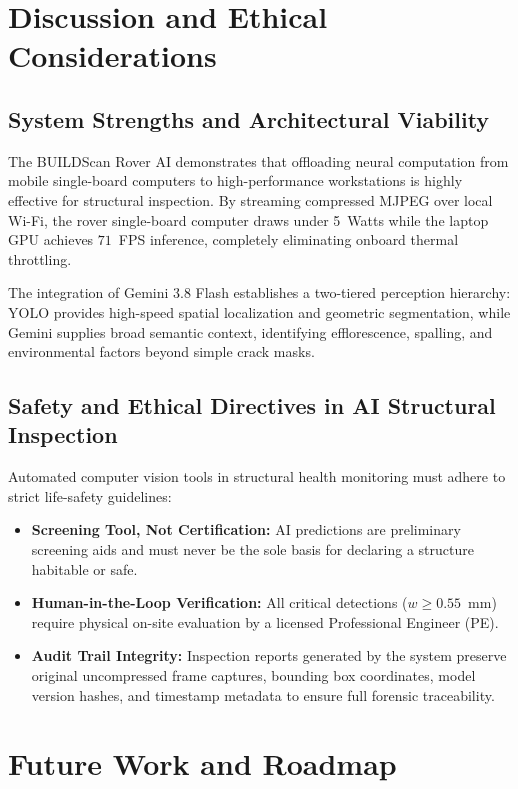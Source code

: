 \documentclass[12pt,a4paper,oneside]{report}
\begin{document}
\chapter{Discussion and Ethical Considerations}
\label{ch:discussion}
\enlargethispage{2\baselineskip}

\section{System Strengths and Architectural Viability}
The BUILDScan Rover AI demonstrates that offloading neural computation from mobile single-board computers to high-performance workstations is highly effective for structural inspection. By streaming compressed MJPEG over local Wi-Fi, the rover single-board computer draws under 5~Watts while the laptop GPU achieves $71$~FPS inference, completely eliminating onboard thermal throttling.

The integration of Gemini 3.8 Flash establishes a two-tiered perception hierarchy: YOLO provides high-speed spatial localization and geometric segmentation, while Gemini supplies broad semantic context, identifying efflorescence, spalling, and environmental factors beyond simple crack masks.

\section{Safety and Ethical Directives in AI Structural Inspection}
Automated computer vision tools in structural health monitoring must adhere to strict life-safety guidelines:
\begin{itemize}\setlength{\itemsep}{2pt}\setlength{\parsep}{0pt}
  \item \textbf{Screening Tool, Not Certification:} AI predictions are preliminary screening aids and must never be the sole basis for declaring a structure habitable or safe.
  \item \textbf{Human-in-the-Loop Verification:} All critical detections ($w \ge 0.55$~mm) require physical on-site evaluation by a licensed Professional Engineer (PE).
  \item \textbf{Audit Trail Integrity:} Inspection reports generated by the system preserve original uncompressed frame captures, bounding box coordinates, model version hashes, and timestamp metadata to ensure full forensic traceability.
\end{itemize}


\chapter{Future Work and Roadmap}
\label{ch:future}
\end{document}
